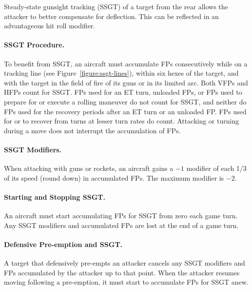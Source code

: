 \begin{advancedrules}
{

}{

Steady-state gunsight tracking (SSGT) of a target from the rear allows the attacker to better compensate for deflection. This can be reflected in an advantageous hit roll modifier.

\paragraph{SSGT Procedure.}
 To benefit from SSGT, an aircraft must accumulate FPs consecutively while on a tracking line (see Figure~\ref{figure:ssgt-lines}), within six hexes of the target, and with the target in the field of fire of its guns or in its limited arc. Both VFPs and HFPs count for SSGT. FPs used for an ET turn, unloaded FPs, or FPs used to prepare for or execute a rolling maneuver do not count for SSGT, and neither do FPs used for the recovery periods after an ET turn or an unloaded FP. FPs used for or to recover from turns at lesser turn rates do count. Attacking or turning during a move does not interrupt the accumulation of FPs.

\paragraph{SSGT Modifiers.} When attacking with guns or rockets, an aircraft gains a $-1$ modifier of each 1/3 of its speed (round down) in accumulated FPs. The maximum modifier is $-2$. 

\paragraph{Starting and Stopping SSGT.}
An aircraft must start accumulating FPs for SSGT from zero each game turn. Any SSGT modifiers and accumulated FPs are lost at the end of a game turn. 

\paragraph{Defensive Pre-emption and SSGT.}
A target that defensively pre-empts an attacker cancels any SSGT modifiers and FPs accumulated by the attacker up to that point. When the attacker resumes moving following a pre-emption, it must start to accumulate FPs for SSGT anew.

}
\end{advancedrules}
